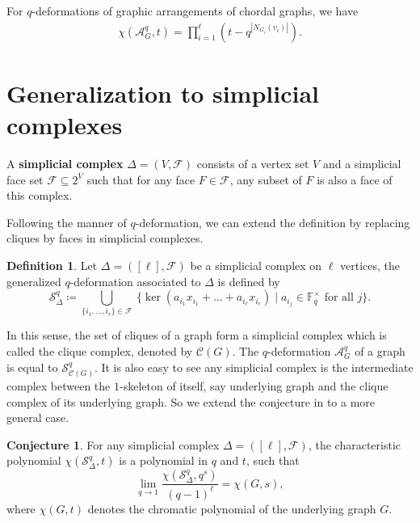 \documentclass[12pt]{article}
\theoremstyle{plain}%
\theoremstyle{definition}
\newtheorem{definition}[theorem]{Definition}
\newtheorem{conjecture}[theorem]{Conjecture}
\begin{document}
For $q$-deformations of graphic arrangements of chordal graphs, we have
\begin{align*}
\chi(\mathcal{A}_{G}^{q}, t) = \prod_{i=1}^{\ell}\left(t-q^{|N_{G_{i}}(v_{i})|}\right).
\end{align*}




\section{Generalization to simplicial complexes}\label{section2}
A \textbf{simplicial complex} $\Delta=(V,\mathcal{F})$ consists of a vertex set $V$ and a simplicial face set $\mathcal{F}\subseteq 2^V$ such that for any face $F\in\mathcal{F}$, any subset of $F$ is also a face of this complex.

Following the manner of $q$-deformation, we can extend the definition by replacing cliques by faces in simplicial complexes.

\begin{definition}
    Let $\Delta=([\ell], \mathcal{F})$ be a simplicial complex on $\ell$ vertices, the generalized $q$-deformation associated to $\Delta$ is defined by
    $$\mathcal{S}_\Delta^q \coloneqq \bigcup_{\{i_{1}, \dots, i_{r}\}\in \mathcal{F}}\ \{ \ker (a_{i_{1}}x_{i_{1}} + \dots + a_{i_{r}}x_{i_{r}}) \mid a_{i_j}\in \mathbb{F}_q^\times\text{ for all }j\}.$$
\end{definition}

In this sense, the set of cliques of a graph form a simplicial complex which is called the clique complex, denoted by $\mathcal{C}(G)$. The $q$-deformation $\mathcal{A}_G^q$ of a graph is equal to $\mathcal{S}_{\mathcal{C}(G)}^q$. 
It is also easy to see any simplicial complex is the intermediate complex between the $1$-skeleton of itself, say underlying graph and the clique complex of its underlying graph. So we extend the conjecture in \cite{nian2024qdeformationchromaticpolynomialsgraphical} to a more general case.
\begin{conjecture}\label{main conjecture}
    For any simplicial complex $\Delta=([\ell], \mathcal{F})$, the characteristic polynomial $\chi(\mathcal{S}_\Delta^q, t)$ is a polynomial in $q$ and $t$, such that
    \[
\lim_{q\to 1}\frac{\chi(\mathcal{S}_\Delta^q, q^s)}{(q-1)^\ell}
=\chi(G, s),
\]
where $\chi(G, t)$ denotes the chromatic polynomial of the underlying graph $G$.
\end{conjecture}
\end{document}
